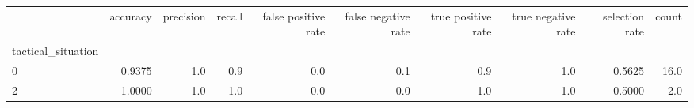 \begin{tabular}{lrrrrrrrrr}
\toprule
{} &  accuracy &  precision &  recall &  false positive rate &  false negative rate &  true positive rate &  true negative rate &  selection rate &  count \\
tactical\_situation &           &            &         &                      &                      &                     &                     &                 &        \\
\midrule
0                  &    0.9375 &        1.0 &     0.9 &                  0.0 &                  0.1 &                 0.9 &                 1.0 &          0.5625 &   16.0 \\
2                  &    1.0000 &        1.0 &     1.0 &                  0.0 &                  0.0 &                 1.0 &                 1.0 &          0.5000 &    2.0 \\
\bottomrule
\end{tabular}

